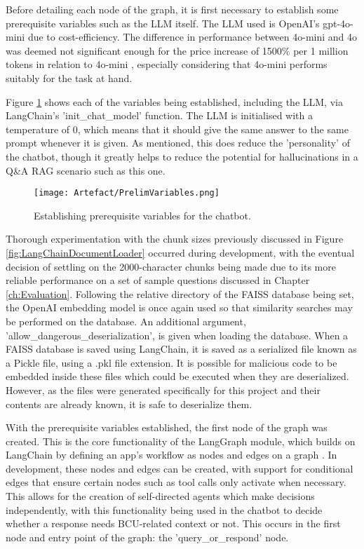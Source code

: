 \para Before detailing each node of the graph, it is first necessary to establish some prerequisite variables such as the LLM itself. 
The LLM used is OpenAI's gpt-4o-mini due to cost-efficiency. The difference in performance between 4o-mini and 4o was deemed not significant 
enough for the price increase of 1500\% per 1 million tokens in relation to 4o-mini \autocite{openaiPricing}, especially considering that 4o-mini
performs suitably for the task at hand.

\para Figure \ref{fig:PrelimVariables} shows each of the variables being established, including the LLM, 
via LangChain's 'init\_chat\_model' function. The LLM is initialised with a temperature of 0, which means that it should give the same 
answer to the same prompt whenever it is given. As mentioned, this does reduce the 'personality' of the chatbot, though it greatly helps 
to reduce the potential for hallucinations in a Q\&A RAG scenario such as this one.

\begin{figure}[H]
    \centering
    \texttt{[image: Artefact/PrelimVariables.png]}
    \caption{Establishing prerequisite variables for the chatbot. \label{fig:PrelimVariables}}
\end{figure}

\noindent Thorough experimentation with the chunk sizes previously discussed in Figure \ref{fig:LangChainDocumentLoader} occurred during 
development, with the eventual decision of settling on the 2000-character chunks being made due to its more reliable performance on a set 
of sample questions discussed in Chapter \ref{ch:Evaluation}. Following the relative directory of the FAISS database being set, the 
OpenAI embedding model is once again used so that similarity searches may be performed on the database. An additional argument,
'allow\_dangerous\_deserialization', is given when loading the database. When a FAISS database is saved using LangChain, it is saved as a 
serialized file known as a Pickle file, using a .pkl file extension. It is possible for malicious code to be embedded inside these files
which could be executed when they are deserialized. However, as the files were generated specifically for this project and their contents 
are already known, it is safe to deserialize them.

\para With the prerequisite variables established, the first node of the graph was created. This is the core functionality of the LangGraph 
module, which builds on LangChain by defining an app's workflow 
as nodes and edges on a graph \autocite{langgraphLangGraph}. In development, these nodes and edges can be created, with support for conditional 
edges that ensure certain nodes such as tool calls only activate when necessary. This allows for the creation of self-directed agents which make 
decisions independently, with this functionality being used in the chatbot to decide whether a response needs BCU-related context or not. This 
occurs in the first node and entry point of the graph: the 'query\_or\_respond' node.

